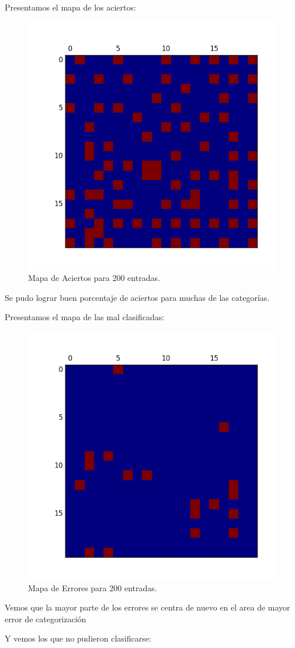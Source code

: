 Presentamos el mapa de los aciertos:


\begin{figure}[H]
  \centering
  \includegraphics[width=0.5\columnwidth]{secciones/graficos/kohonen/mapaaciertos200.png}
  \caption{Mapa de Aciertos para 200 entradas.}
  \label{fig:mapa acierto 200}
\end{figure}

Se pudo lograr buen porcentaje de aciertos para muchas de las categorías.

Presentamos el mapa de las mal clasificadas:


\begin{figure}[H]
  \centering
  \includegraphics[width=0.5\columnwidth]{secciones/graficos/kohonen/mapaerrores200.png}
  \caption{Mapa de Errores para 200 entradas.}
  \label{fig:mapa error 200}
\end{figure}

Vemos que la mayor parte de los errores se centra de nuevo en el area de 
mayor error de categorización

Y vemos los que no pudieron clasificarse:


